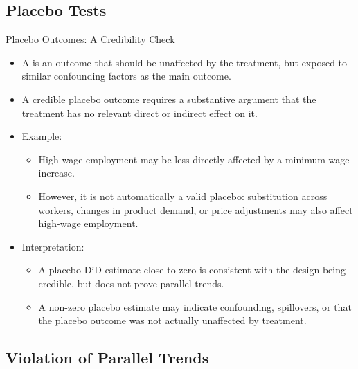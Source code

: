 \documentclass[11pt,aspectratio=169]{beamer}
\begin{document}
\subsection{Placebo Tests}

\begin{frame}{Placebo Outcomes: A Credibility Check}
\small
\begin{itemize}
  \item A  is an outcome that should be unaffected by the treatment, but exposed to similar confounding factors as the main outcome.
  \item A credible placebo outcome requires a substantive argument that the treatment has no relevant direct or indirect effect on it.
  \item Example:
  \begin{itemize}
    \item High-wage employment may be less directly affected by a minimum-wage increase.
    \item However, it is not automatically a valid placebo: substitution across workers, changes in product demand, or price adjustments may also affect high-wage employment.
  \end{itemize}
  \item Interpretation:
  \begin{itemize}
    \item A placebo DiD estimate close to zero is consistent with the design being credible, but does not prove parallel trends.
    \item A non-zero placebo estimate may indicate confounding, spillovers, or that the placebo outcome was not actually unaffected by treatment.
  \end{itemize}
\end{itemize}
\end{frame}


\subsection{Violation of Parallel Trends}
\end{document}
